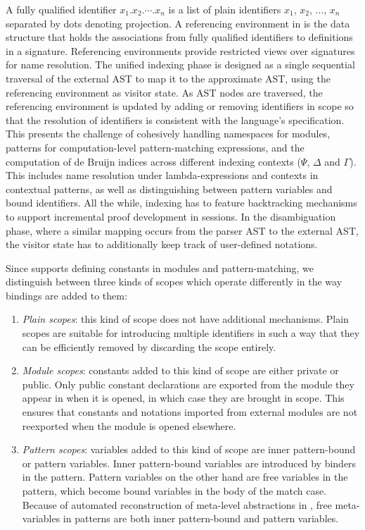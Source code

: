 A fully qualified identifier $x_1.x_2.\cdots.x_n$ is a list of plain identifiers $x_1$, $x_2$, $\dots$, $x_n$ separated by dots denoting projection.
A referencing environment in \Beluga is the data structure that holds the associations from fully qualified identifiers to definitions in a signature.
Referencing environments provide restricted views over signatures for name resolution.
The unified indexing phase is designed as a single sequential traversal of the external \ac{AST} to map it to the approximate \ac{AST}, using the referencing environment as visitor state.
As \ac{AST} nodes are traversed, the referencing environment is updated by adding or removing identifiers in scope so that the resolution of identifiers is consistent with the language's specification.
This presents the challenge of cohesively handling namespaces for modules, patterns for computation-level pattern-matching expressions, and the computation of de Bruijn indices across different indexing contexts ($\Psi$, $\Delta$ and $\Gamma$).
This includes name resolution under lambda-expressions and contexts in contextual \LF patterns, as well as distinguishing between pattern variables and bound identifiers.
All the while, indexing has to feature backtracking mechanisms to support incremental proof development in \Harpoon sessions.
In the disambiguation phase, where a similar mapping occurs from the parser \ac{AST} to the external \ac{AST}, the visitor state has to additionally keep track of user-defined notations.

Since \Beluga supports defining constants in modules and pattern-matching, we distinguish between three kinds of scopes which operate differently in the way bindings are added to them:
\begin{enumerate}
\item
\textit{Plain scopes}: this kind of scope does not have additional mechanisms.
Plain scopes are suitable for introducing multiple identifiers in such a way that they can be efficiently removed by discarding the scope entirely.
\item
\textit{Module scopes}: constants added to this kind of scope are either private or public.
Only public constant declarations are exported from the module they appear in when it is opened, in which case they are brought in scope.
This ensures that constants and notations imported from external modules are not reexported when the module is opened elsewhere.
\item
\textit{Pattern scopes}: variables added to this kind of scope are inner pattern-bound or pattern variables.
Inner pattern-bound variables are introduced by binders in the pattern.
Pattern variables on the other hand are free variables in the pattern, which become bound variables in the body of the match case.
Because of automated reconstruction of meta-level abstractions in \Beluga, free meta-variables in patterns are both inner pattern-bound and pattern variables.
\end{enumerate}


